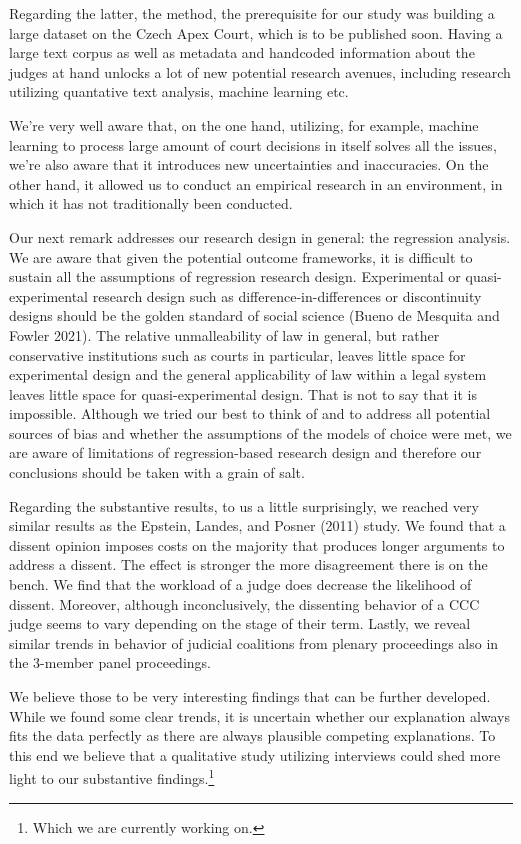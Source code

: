 \documentclass[
  11pt,
]{article}
\begin{document}
Regarding the latter, the method, the prerequisite for our study was
building a large dataset on the Czech Apex Court, which is to be
published soon. Having a large text corpus as well as metadata and
handcoded information about the judges at hand unlocks a lot of new
potential research avenues, including research utilizing quantative text
analysis, machine learning etc.

We're very well aware that, on the one hand, utilizing, for example,
machine learning to process large amount of court decisions in itself
solves all the issues, we're also aware that it introduces new
uncertainties and inaccuracies. On the other hand, it allowed us to
conduct an empirical research in an environment, in which it has not
traditionally been conducted.

Our next remark addresses our research design in general: the regression
analysis. We are aware that given the potential outcome frameworks, it
is difficult to sustain all the assumptions of regression research
design. Experimental or quasi-experimental research design such as
difference-in-differences or discontinuity designs should be the golden
standard of social science (Bueno de Mesquita and Fowler 2021). The
relative unmalleability of law in general, but rather conservative
institutions such as courts in particular, leaves little space for
experimental design and the general applicability of law within a legal
system leaves little space for quasi-experimental design. That is not to
say that it is impossible. Although we tried our best to think of and to
address all potential sources of bias and whether the assumptions of the
models of choice were met, we are aware of limitations of
regression-based research design and therefore our conclusions should be
taken with a grain of salt.

Regarding the substantive results, to us a little surprisingly, we
reached very similar results as the Epstein, Landes, and Posner (2011)
study. We found that a dissent opinion imposes costs on the majority
that produces longer arguments to address a dissent. The effect is
stronger the more disagreement there is on the bench. We find that the
workload of a judge does decrease the likelihood of dissent. Moreover,
although inconclusively, the dissenting behavior of a CCC judge seems to
vary depending on the stage of their term. Lastly, we reveal similar
trends in behavior of judicial coalitions from plenary proceedings also
in the 3-member panel proceedings.

We believe those to be very interesting findings that can be further
developed. While we found some clear trends, it is uncertain whether our
explanation always fits the data perfectly as there are always plausible
competing explanations. To this end we believe that a qualitative study
utilizing interviews could shed more light to our substantive
findings.\footnote{Which we are currently working on.}
\end{document}
